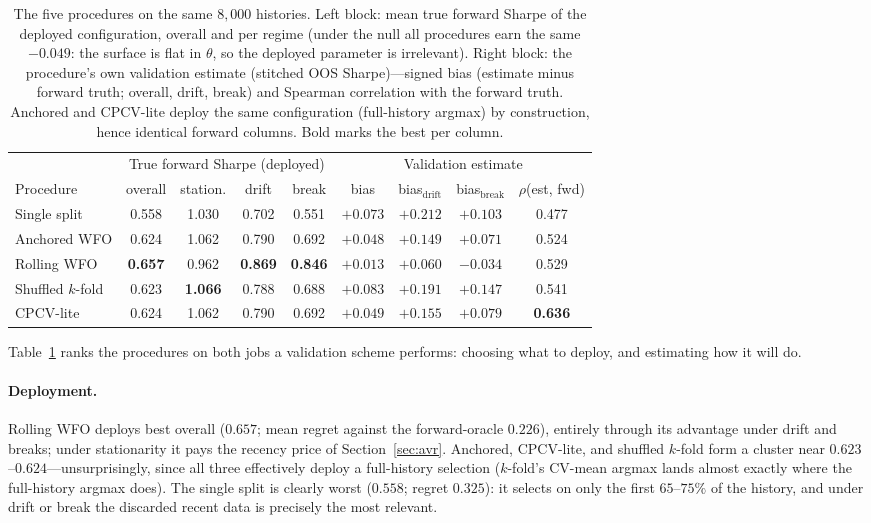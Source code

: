 \documentclass[11pt]{article}
\begin{document}
\begin{table}[t]
\centering
\caption{The five procedures on the same $8{,}000$ histories. Left block:
mean true forward Sharpe of the deployed configuration, overall and per
regime (under the null all procedures earn the same $-0.049$: the surface is
flat in $\theta$, so the deployed parameter is irrelevant). Right block: the
procedure's own validation estimate (stitched OOS Sharpe)---signed bias
(estimate minus forward truth; overall, drift, break) and Spearman
correlation with the forward truth. Anchored and CPCV-lite deploy the same
configuration (full-history argmax) by construction, hence identical forward
columns. Bold marks the best per column.}
\label{tab:proc}
\small
\begin{tabular}{lcccc@{\hskip 1.6em}cccc}
\toprule
& \multicolumn{4}{c}{True forward Sharpe (deployed)} &
\multicolumn{4}{c}{Validation estimate} \\
\cmidrule(lr){2-5}\cmidrule(lr){6-9}
Procedure & overall & station. & drift & break & bias & bias$_{\text{drift}}$ & bias$_{\text{break}}$ & $\rho$(est, fwd) \\
\midrule
Single split      & 0.558 & 1.030 & 0.702 & 0.551 & $+0.073$ & $+0.212$ & $+0.103$ & 0.477 \\
Anchored WFO      & 0.624 & 1.062 & 0.790 & 0.692 & $+0.048$ & $+0.149$ & $+0.071$ & 0.524 \\
Rolling WFO       & \textbf{0.657} & 0.962 & \textbf{0.869} & \textbf{0.846} & $\mathbf{+0.013}$ & $\mathbf{+0.060}$ & $\mathbf{-0.034}$ & 0.529 \\
Shuffled $k$-fold & 0.623 & \textbf{1.066} & 0.788 & 0.688 & $+0.083$ & $+0.191$ & $+0.147$ & 0.541 \\
CPCV-lite         & 0.624 & 1.062 & 0.790 & 0.692 & $+0.049$ & $+0.155$ & $+0.079$ & \textbf{0.636} \\
\bottomrule
\end{tabular}
\end{table}

Table~\ref{tab:proc} ranks the procedures on both jobs a validation scheme
performs: choosing what to deploy, and estimating how it will do.

\paragraph{Deployment.} Rolling WFO deploys best overall ($0.657$; mean
regret against the forward-oracle $0.226$), entirely through its advantage
under drift and breaks; under stationarity it pays the recency price of
Section~\ref{sec:avr}. Anchored, CPCV-lite, and shuffled $k$-fold form a
cluster near $0.623$--$0.624$---unsurprisingly, since all three effectively
deploy a full-history selection ($k$-fold's CV-mean argmax lands almost
exactly where the full-history argmax does). The single split is clearly
worst ($0.558$; regret $0.325$): it selects on only the first
$65$--$75\%$ of the history, and under drift or break the discarded recent
data is precisely the most relevant.
\end{document}
